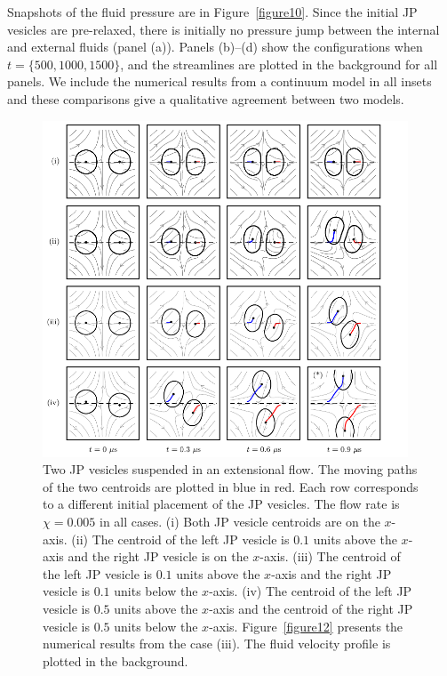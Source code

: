 \documentclass[lineno]{jfm}
\begin{document}
Snapshots of the fluid pressure are in Figure~\ref{figure10}. Since the
initial JP vesicles are pre-relaxed, there is initially no pressure jump
between the internal and external fluids (panel (a)). Panels (b)--(d)
show the configurations when $t = \{500,1000,1500\}$, and the
streamlines are plotted in the background for all panels. We include the
numerical results from a continuum model in all insets and these
comparisons give a qualitative agreement between two models.

\begin{figure}
\begin{center}
\includegraphics[width=0.97\textwidth]{Figure11_Wrapper.pdf}
\end{center} 
  \caption{\label{figure11} Two JP vesicles suspended in
  an extensional flow. The moving paths of the two centroids are plotted
  in blue in red. Each row corresponds to a different initial placement
  of the JP vesicles. The flow rate is $\chi = 0.005$ in all cases.
  (i) Both JP vesicle centroids are on the $x$-axis. (ii) The
  centroid of the left JP vesicle is $0.1$ units above the $x$-axis
  and the right JP vesicle is on the $x$-axis. (iii) The centroid of
  the left JP vesicle is $0.1$ units above the $x$-axis and the right
  JP vesicle is $0.1$ units below the $x$-axis. (iv) The centroid of
  the left JP vesicle is $0.5$ units above the $x$-axis and the
  centroid of the right JP vesicle is $0.5$ units below the $x$-axis.
  Figure~\ref{figure12} presents the numerical results from the case
  (iii).  The fluid velocity profile is plotted in the background.}
\end{figure}
\end{document}

